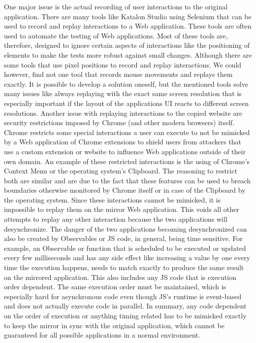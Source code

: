  One major issue is the actual recording of user interactions to the original application. There are many tools like Katalon Studio \cite{Katalon} using Selenium \cite{Selenium} that can be used to record and replay interactions to a Web application. These tools are often used to automate the testing of Web applications. Most of these tools are, therefore, designed to ignore certain aspects of interactions like the positioning of elements to make the tests more robust against small changes. Although there are some tools that use pixel positions to record and replay interactions. We could however, find not one tool that records mouse movements and replays them exactly. It is possible to develop a solution oneself, but the mentioned tools solve many issues like always replaying with the exact same screen resolution that is especially important if the layout of the applications UI reacts to different screen resolutions. Another issue with replaying interactions to the copied website are security restrictions imposed by Chrome (and other modern browsers) itself. Chrome restricts some special interactions a user can execute to not be mimicked by a Web application of Chrome extensions to shield users from attackers that use a custom extension or website to influence Web applications outside of their own domain. An example of these restricted interactions is the using of Chrome's Context Menu or the operating system's Clipboard. The reasoning to restrict both are similar and are due to the fact that these features can be used to breach boundaries otherwise monitored by Chrome itself or in case of the Clipboard by the operating system. Since these interactions cannot be mimicked, it is impossible to replay them on the mirror Web application. This voids all other attempts to replay any other interaction because the two applications will desynchronize. The danger of the two applications becoming desynchronized can also be created by Observables or JS code, in general, being time sensitive. For example, an Observable or function that is scheduled to be executed or updated every few milliseconds and has any side effect like increasing a value by one every time the execution happens, needs to match exactly to produce the same result on the mirrored application. This also includes any JS code that is execution order dependent. The same execution order must be maintained, which is especially hard for asynchronous code even though JS's runtime is event-based \cite{EventBasedJS} and does not actually execute code in parallel. In summary, any code dependent on the order of execution or anything timing related has to be mimicked exactly to keep the mirror in sync with the original application, which cannot be guaranteed for all possible applications in a normal environment. \\

